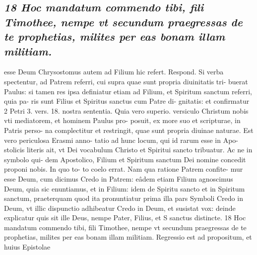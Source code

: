 \documentclass{article}
\begin{document}
\begin{pages}
\subsection*{\textit{18 Hoc mandatum commendo tibi, fili Timothee, nempe vt secundum praegressas de te prophetias, milites per eas bonam illam militiam.}}esse Deum Chrysostomus autem ad Filium hic refert. Respond. Si verba spectentur, ad Patrem referri, cui supra quae sunt propria diuinitatis tri- buerat Paulus: si tamen res ipsa definiatur etiam ad Filium, et Spiritum sanctum referri, quia pa- ris sunt Filius et Spiritus sanctus cum Patre di- gnitatis: et confirmatur 2 Petri 3. vers. 18. nostra sententia. Quia vero superio. versiculo Christum nobis vti mediatorem, et hominem Paulus pro- posuit, ex more suo et scripturae, in Patris perso- na complectitur et restringit, quae sunt propria diuinae naturae. Est vero periculosa Erasmi anno- tatio ad hunc locum, qui id rarum esse in Apo- stolicis literis ait, vt Dei vocabulum Christo et Spiritui sancto tribuatur. Ac ne in symbolo qui- dem Apostolico, Filium et Spiritum sanctum Dei nomine concedit proponi nobis. In quo to- to coelo errat. Nam qua ratione Patrem confite- mur esse Deum, cum dicimus Credo in Patrem: eâdem etiam Filium agnoscimus Deum, quia sic enuntiamus, et in Filium: idem de Spiritu sancto et in Spiritum sanctum, praeterquam quod ita pronuntiatur prima illa pars Symboli Credo in Deum, vt illic dispunctio adhibeatur Credo in Deum, et susistat vox: deinde explicatur quis sit ille Deus, nempe Pater, Filius, et S sanctus distincte. 18 Hoc mandatum commendo tibi, fili Timothee, nempe vt secundum praegressas de te prophetias, milites per eas bonam illam militiam. Regressio est ad propositum, et huius Epistolae  \pend

\end{pages}
\end{document}
